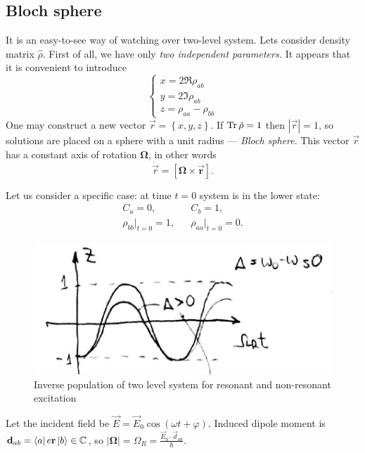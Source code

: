 \subsection{Bloch sphere}

It is an easy-to-see way of watching over two-level system. Lets consider density matrix $\hat{\rho}$. First of all, we have only \textit{two independent parameters.} It appears that it is convenient to introduce
\begin{equation}
	\begin{cases}
		x = 2 \Re \rho_{ab} \\
		y = 2 \Im \rho_{ab} \\
		z = \rho_{aa} - \rho_{bb}
	\end{cases}
	\label{eq:tmp_system}
\end{equation}
One may construct a new vector $\vec{r} = \left\{ x,y,z \right\}$. If $\operatorname{Tr} \hat{\rho} = 1$ then $\left|\vec{r}\right| = 1$, so solutions are placed on a sphere with a unit radius --- \textit{Bloch sphere}.
This vector $\vec{r}$ has a constant axis of rotation $\bm{\Omega}$, in other words
\begin{equation}
	\dot{\vec{r}} = \left[ \bm{\Omega \times \vec{r}} \right].
\end{equation}

Let us consider a specific case: at time $t= 0$ system is in the lower state:
\begin{equation}
	\begin{matrix}
			C_a = 0, & & C_b = 1, \\
		\rho_{bb} \big|_{t=0} = 1, & & \rho_{aa} \big|_{t=0} = 0.
	\end{matrix}
\end{equation}
\begin{figure}[h!]
	\centering
	\includegraphics[width=0.6\linewidth]{fig/L5/invers_population}
	\caption{Inverse population of two level system for resonant and non-resonant excitation}
	\label{fig:inverspopulation}
\end{figure}
Let the incident field be $\vec{E} = \vec{E}_0 \cos \left( \omega t + \varphi \right)$. Induced dipole moment is $\mathbf{d}_{ab} = \left\langle {a} \right\rvert e \mathbf{r} \left\lvert {b} \right\rangle \in \mathbb{C}$, so $\left| \bm{\Omega} \right| = \Omega_R = \frac{\vec{E}_0 \cdot \vec{d}_{ab}}{\hbar}$.

